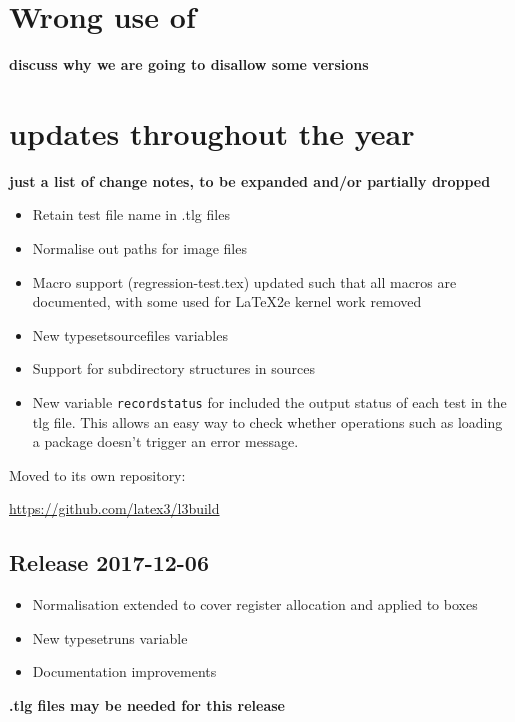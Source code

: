 \documentclass{ltnews}
\begin{document}
\section{Wrong use of }

\textbf{discuss why we are going to disallow some versions}





\section{ updates throughout the year}

\textbf{just a list of change notes, to be expanded and/or partially dropped}

\begin{itemize}
\item Retain test file name in .tlg files
\item Normalise out paths for image files
\item Macro support (regression-test.tex) updated such that
  all macros are documented, with some used for LaTeX2e kernel
  work removed
\item New typesetsourcefiles variables
\item Support for subdirectory structures in sources
\item New variable \texttt{recordstatus} for included the output status of each test in the tlg file. This allows an easy way to check whether operations such as loading a package doesn't trigger an error message.
\end{itemize}

Moved  to its own repository:

\url{https://github.com/latex3/l3build}


\subsection{Release 2017-12-06}

\begin{itemize}
\item Normalisation extended to cover
  register allocation and
   applied to boxes
\item New typesetruns variable
\item Documentation improvements
\end{itemize}


\textbf{.tlg files may be needed for this release}
\end{document}
